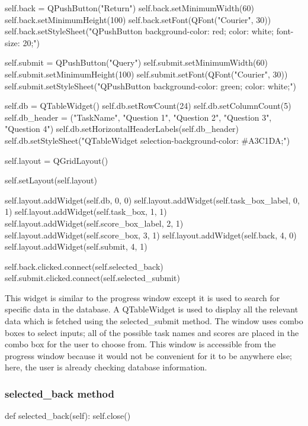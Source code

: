\begin{python}
        self.back = QPushButton("Return")
        self.back.setMinimumWidth(60)
        self.back.setMinimumHeight(100)
        self.back.setFont(QFont("Courier", 30))
        self.back.setStyleSheet("QPushButton {background-color: red; color: white; font-size: 20;}")
        
        self.submit = QPushButton("Query")
        self.submit.setMinimumWidth(60)
        self.submit.setMinimumHeight(100)
        self.submit.setFont(QFont("Courier", 30))
        self.submit.setStyleSheet("QPushButton {background-color: green; color: white;}")

        self.db = QTableWidget()
        self.db.setRowCount(24)
        self.db.setColumnCount(5)
        self.db_header = ("TaskName", "Question 1", "Question 2", "Question 3", "Question 4")
        self.db.setHorizontalHeaderLabels(self.db_header)
        self.db.setStyleSheet("QTableWidget {selection-background-color: #A3C1DA;}")

        self.layout = QGridLayout()

        self.setLayout(self.layout)

        self.layout.addWidget(self.db, 0, 0)
        self.layout.addWidget(self.task_box_label, 0, 1)
        self.layout.addWidget(self.task_box, 1, 1)
        self.layout.addWidget(self.score_box_label, 2, 1)
        self.layout.addWidget(self.score_box, 3, 1)
        self.layout.addWidget(self.back, 4, 0)
        self.layout.addWidget(self.submit, 4, 1)

        self.back.clicked.connect(self.selected_back)
        self.submit.clicked.connect(self.selected_submit)
\end{python}

This widget is similar to the progress window except it is used to search for specific data in the database. A QTableWidget is used to display all the relevant data which is fetched using the selected\_submit method. The window uses combo boxes to select inputs; all of the possible task names and scores are placed in the combo box for the user to choose from. This window is accessible from the progress window because it would not be convenient for it to be anywhere else; here, the user is already checking database information.

\subsubsection{selected\_back method}

\begin{python}
def selected_back(self):
        self.close()
\end{python}

